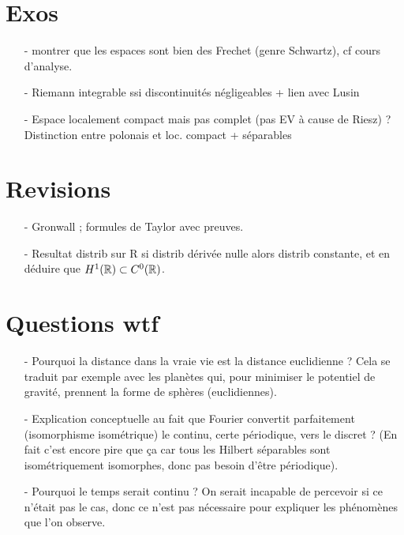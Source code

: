 \documentclass[11pt,a4paper]{article}
\begin{document}
\section{Exos}
\begin{itemize}
\item[-] montrer que les espaces sont bien des Frechet (genre Schwartz), cf cours d'analyse.
\item[-] Riemann integrable ssi discontinuités négligeables + lien avec Lusin
\item[-] Espace localement compact mais pas complet (pas EV à cause de Riesz) ? Distinction entre polonais et loc. compact + séparables 
\end{itemize}

\section{Revisions}
\begin{itemize}
\item[-] Gronwall ; formules de Taylor avec preuves.
\item[-] Resultat distrib sur R si distrib dérivée nulle alors distrib constante, et en déduire que $H^1(\mathbb R) \subset C^0(\mathbb R)$.
\end{itemize}

\section{Questions wtf}
\begin{itemize}
\item[-] Pourquoi la distance dans la vraie vie est la distance euclidienne ? Cela se traduit par exemple avec les planètes qui, pour minimiser le potentiel de gravité, prennent la forme de sphères (euclidiennes). \\
\item[-] Explication conceptuelle au fait que Fourier convertit parfaitement (isomorphisme isométrique) le continu, certe périodique, vers le discret ? (En fait c'est encore pire que ça car tous les Hilbert séparables sont isométriquement isomorphes, donc pas besoin d'être périodique).
\item[-] Pourquoi le temps serait continu ? On serait incapable de percevoir si ce n’était pas le cas, donc ce n’est pas nécessaire pour expliquer les phénomènes que l’on observe. 
\end{itemize}
\end{document}
